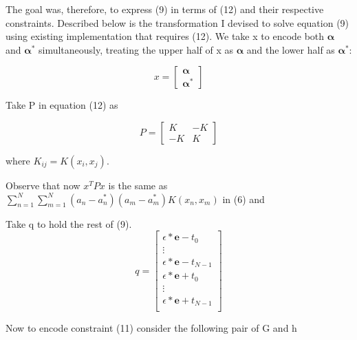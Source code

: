 \documentclass[12pt,twoside,notitlepage]{report}
\begin{document}
The goal was, therefore, to express (9) in terms of (12) and their respective constraints.
Described below is the transformation I devised to solve equation (9) using existing implementation that requires (12).
We take x to encode both \(\bm{\alpha}\) and \(\bm{\alpha^*}\) simultaneously, treating the upper half of x as 
\(\bm{\alpha}\) and the lower half 
as \(\bm{\alpha^*}\):


\[x =
  \begin{bmatrix}
    \bm{ \alpha} \\
    \bm{ \alpha^*}
  \end{bmatrix}
\]

Take P in equation (12) as 

\[P =
\begin{bmatrix}
       K & -K           \\
       -K & K            
     \end{bmatrix}
\]

where \(K_{ij} = K(x_i,x_j)\).

Observe that now \(x^T P x\) is the same as 
\(\sum_{n=1}^{N}\sum_{m=1}^{N}(a_n-a_n^*)(a_m-a_m^*)K(x_n,x_m)\) in (6) and 

Take q to hold the rest of (9).
\[q =
\begin{bmatrix}
  \epsilon*\mathbf{e}-t_0           \\
  \vdots                                     \\
  \epsilon*\mathbf{e}-t_{N-1}           \\
   \epsilon*\mathbf{e}+t_0           \\
   \vdots                           \\
  \epsilon*\mathbf{e}+t_{N-1}           \\
     \end{bmatrix}
\]

Now to encode constraint (11) consider the following pair of G and h
\end{document}
